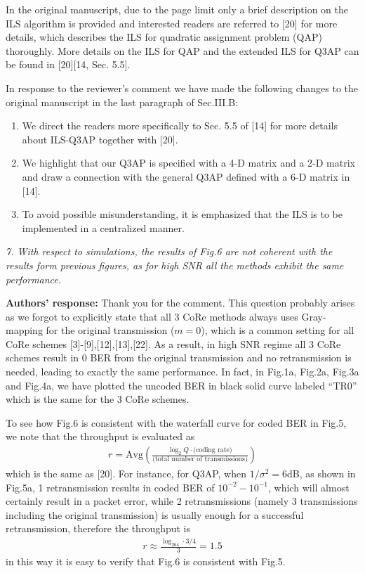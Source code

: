 \documentclass[onecolumn, 11pt, draftclsnofoot]{IEEEtran}
\begin{document}
In the original manuscript, due to the page limit only a brief description on
the ILS algorithm is provided and interested readers are referred to [20] for
more details, which describes the ILS for quadratic assignment problem (QAP)
thoroughly. More details on the ILS for QAP and the extended ILS for Q3AP can be
found in [20][14, Sec. 5.5].

In response to the reviewer's comment we have made the following changes to the
original manuscript in the last paragraph of Sec.III.B:
\begin{enumerate}
  \item We direct the readers more specifically to Sec. 5.5 of [14] for more
  details about ILS-Q3AP together with [20].
  \item We highlight that our Q3AP is specified with a 4-D matrix and a
  2-D matrix and draw a connection with the general Q3AP defined with a 6-D
  matrix in [14].
  \item To avoid possible misunderstanding, it is emphasized that the ILS is to
  be implemented in a centralized manner.
\end{enumerate}

\vspace{0.5cm}

\noindent
\emph{7. With respect to simulations, the results of Fig.6 are not coherent with
the results form previous figures, as for high SNR all the methods exhibit the
same performance.}

\noindent \textbf{Authors' response:}
Thank you for the comment. This question probably arises as we forgot to
explicitly state that all 3 CoRe methods always uses Gray-mapping for the
original transmission ($m=0$), which is a common setting for all CoRe schemes
[3]-[9],[12],[13],[22]. As a result, in high SNR regime all 3 CoRe schemes
result in 0 BER from the original transmission and no retransmission is needed,
leading to exactly the same performance. In fact, in Fig.1a, Fig.2a, Fig.3a and
Fig.4a, we have plotted the uncoded BER in black solid curve labeled ``TR0''
which is the same for the 3 CoRe schemes.

To see how Fig.6 is consistent with the waterfall curve for coded BER in Fig.5,
we note that the throughput is evaluated as
\begin{align}
  r=\mbox{Avg}\left( \frac{\log_2Q \cdot\mbox{(coding rate)}}{\mbox{(total number
  of transmissions)}} \right)
\end{align}
which is the same as [20]. For instance, for Q3AP, when
$1/\sigma^2=6$dB, as shown in Fig.5a, 1 retransmission results in coded BER of
$10^{-2}-10^{-1}$, which will almost certainly result in a packet error, while 2
retransmissions (namely 3 transmissions including the original transmission) is
usually enough for a successful retransmission, therefore the throughput is
\begin{align}
  r\approx \frac{\log_264\cdot 3/4}{3} = 1.5
\end{align}
in this way it is easy to verify that Fig.6 is consistent with Fig.5.
\end{document}
